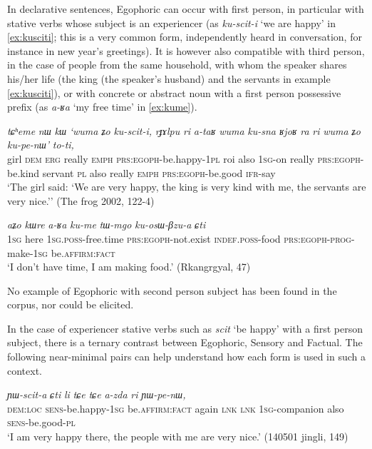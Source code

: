 \documentclass[oldfontcommands,oneside,a4paper,11pt]{article}
\newcommand{\ipa}[1]{{\phon\textit{#1}}} %
\newcommand{\factual}[1]{\textsc{:fact}}
\begin{document}
In declarative sentences, Egophoric can occur with first person, in particular with stative verbs whose subject is an experiencer (as \ipa{ku-scit-i} `we are happy' in \ref{ex:kusciti}; this is a very common form, independently heard in conversation, for instance in new year's greetings). It is however also compatible with third person, in the case of people from the same household, with whom the speaker shares his/her life (the king (the speaker's husband) and the servants in example \ref{ex:kusciti}), or with concrete or abstract noun with a first person possessive prefix (as \ipa{a-ʁa} `my free time' in \ref{ex:kume}).

\begin{exe}
\ex \label{ex:kusciti}
\gll
\ipa{tɕʰeme} 	\ipa{nɯ} 	\ipa{kɯ} 	\ipa{`wuma} 	\ipa{ʑo} 	\ipa{ku-scit-i,} \ipa{rɟɤlpu} 	\ipa{ri} 	\ipa{a-taʁ} 	\ipa{wuma} 	\ipa{ku-sna} \ipa{ʁjoʁ} 	\ipa{ra} 	\ipa{ri} 	\ipa{wuma} 	\ipa{ʑo} 	\ipa{ku-pe-nɯ'} \ipa{to-ti,} \\
girl \textsc{dem} \textsc{erg} really \textsc{emph} \textsc{prs:egoph}-be.happy-\textsc{1pl}  roi also \textsc{1sg}-on really \textsc{prs:egoph}-be.kind servant \textsc{pl} also really \textsc{emph}   \textsc{prs:egoph}-be.good \textsc{ifr}-say \\
\glt `The girl said: `We are very happy, the king is very kind with me, the servants are very nice.''
(The frog 2002, 122-4)
\end{exe}


\begin{exe}
\ex \label{ex:kume}
\gll 
\ipa{aʑo}  	\ipa{kɯre}  	\ipa{a-ʁa}  	\ipa{ku-me}  \ipa{tɯ-mgo} 	\ipa{ku-osɯ-βzu-a} 	\ipa{ɕti} 	  	\\
\textsc{1sg} here \textsc{1sg.poss}-free.time \textsc{prs:egoph}-not.exist \textsc{indef.poss}-food \textsc{prs:egoph}-\textsc{prog}-make-\textsc{1sg} be.\textsc{affirm}\factual{}  \\
\glt `I don't have time, I am making food.'  (Rkangrgyal, 47)
\end{exe}

No example of Egophoric with second person subject has been found in the corpus, nor could be elicited.

In the case of experiencer stative verbs such as \ipa{scit} `be happy' with a first person subject, there is a ternary contrast between Egophoric, Sensory and Factual. The following near-minimal pairs can help understand how each form is used in such a context.

\begin{exe}
\ex \label{ex:YWscita}
\gll  \ipa{nɯtɕu} 	\ipa{ɲɯ-scit-a} 	\ipa{ɕti} 	\ipa{li} 	\ipa{tɕe} 	\ipa{tɕe} 	\ipa{a-zda} 	\ipa{ri} 	\ipa{ɲɯ-pe-nɯ,} \\
\textsc{dem:loc} \textsc{sens}-be.happy-\textsc{1sg} be.\textsc{affirm}:\textsc{fact} again \textsc{lnk} \textsc{lnk} \textsc{1sg}-companion also \textsc{sens}-be.good-\textsc{pl} \\
\glt `I am very happy there, the people with me are very nice.' (140501 jingli, 149)
\end{exe}
\end{document}
